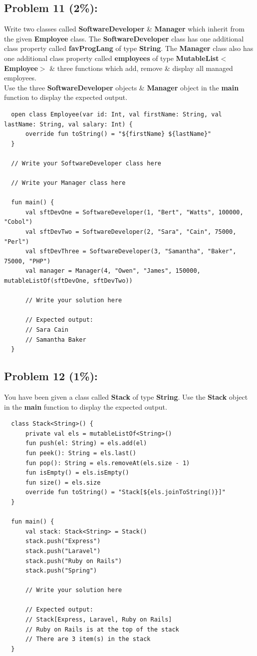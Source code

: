 \documentclass{article}
\begin{document}
\subsection*{Problem 11 (2\%):}
Write two classes called \textbf{SoftwareDeveloper} \& \textbf{Manager} which inherit from the given \textbf{Employee} class. The \textbf{SoftwareDeveloper} class has one additional class property called \textbf{favProgLang} of type \textbf{String}. The \textbf{Manager} class also has one additional class property called \textbf{employees} of type \textbf{MutableList$<$Employee$>$} \& three functions which add, remove \& display all managed employees. \\

Use the three \textbf{SoftwareDeveloper} objects \& \textbf{Manager} object in the \textbf{main} function to display the expected output.

\begin{verbatim}
  open class Employee(var id: Int, val firstName: String, val lastName: String, val salary: Int) {
      override fun toString() = "${firstName} ${lastName}"
  }

  // Write your SoftwareDeveloper class here

  // Write your Manager class here

  fun main() {
      val sftDevOne = SoftwareDeveloper(1, "Bert", "Watts", 100000, "Cobol")
      val sftDevTwo = SoftwareDeveloper(2, "Sara", "Cain", 75000, "Perl")
      val sftDevThree = SoftwareDeveloper(3, "Samantha", "Baker", 75000, "PHP")
      val manager = Manager(4, "Owen", "James", 150000, mutableListOf(sftDevOne, sftDevTwo))

      // Write your solution here

      // Expected output:
      // Sara Cain
      // Samantha Baker
  }
\end{verbatim}

\subsection*{Problem 12 (1\%):}
You have been given a class called \textbf{Stack} of type \textbf{String}. Use the \textbf{Stack} object in the \textbf{main} function to display the expected output.

\begin{verbatim}
  class Stack<String>() {
      private val els = mutableListOf<String>()
      fun push(el: String) = els.add(el)
      fun peek(): String = els.last()
      fun pop(): String = els.removeAt(els.size - 1)
      fun isEmpty() = els.isEmpty()
      fun size() = els.size
      override fun toString() = "Stack[${els.joinToString()}]"
  }

  fun main() {
      val stack: Stack<String> = Stack()
      stack.push("Express")
      stack.push("Laravel")
      stack.push("Ruby on Rails")
      stack.push("Spring")

      // Write your solution here

      // Expected output:
      // Stack[Express, Laravel, Ruby on Rails]
      // Ruby on Rails is at the top of the stack
      // There are 3 item(s) in the stack
  }
\end{verbatim}
\end{document}
